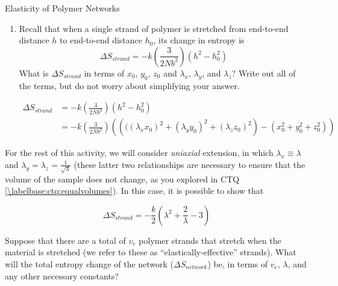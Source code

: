 \begin{activity}{Elasticity of Polymer Networks}
\begin{ctqs}
\begin{enumerate}
			\item Recall that when a single strand of polymer is stretched from end-to-end distance $h$ to end-to-end distance $h_0$, its change in entropy is 
			\begin{equation*}
				\Delta S_{strand} = -k\left(\frac{3}{2Nb^2}\right)(h^2 - h_0^2)
			\end{equation*}
			 What is $\Delta S_{strand}$ in terms of $x_0$, $y_0$, $z_0$ and $\lambda_x$, $\lambda_y$, and $\lambda_z$?  Write out all of the terms, but do not worry about simplifying your answer.
		
				\begin{solution}[2.25in]
					\begin{align*}
						\Delta S_{strand} &= -k\left(\frac{3}{2Nb^2}\right)(h^2 - h_0^2)\\
							&= -k\left(\frac{3}{2Nb^2}\right)\left(\left(((\lambda_x x_0)^2 + (\lambda_y y_0)^2 + (\lambda_z z_0)^2\right) - \left(x_0^2 + y_0^2 + z_0^2\right)\right)
					\end{align*}
				\end{solution}
				
		\end{enumerate}
				
\end{ctqs}

\begin{infobox}

	For the rest of this activity, we will consider \emph{uniaxial} extension, in which $\lambda_x \equiv \lambda$ and $\lambda_y = \lambda_z = \frac{1}{\sqrt{\lambda}}$ (these latter two relationships are necessary to ensure that the volume of the sample does not change, as you explored in CTQ \ref{\labelbase:ctq:equalvolumes}).  In this case, it is possible to show that
	
		\begin{equation*}	
				\Delta S_{strand} = -\frac{k}{2}\left(\lambda^2 + \frac{2}{\lambda} - 3\right)
			\label{\labelbase:eqn:delSstranduniaxial}
		\end{equation*}
			
\end{infobox}

\begin{ctqs}
		
	\question Suppose that there are a total of $v_e$ polymer strands that stretch when the material is stretched (we refer to these as ``elastically-effective'' strands). What will the total entropy change of the network ($\Delta S_{network}$) be, in terms of $v_e$, $\lambda$, and any other necessary constants?
		

\end{ctqs}
\end{activity}
